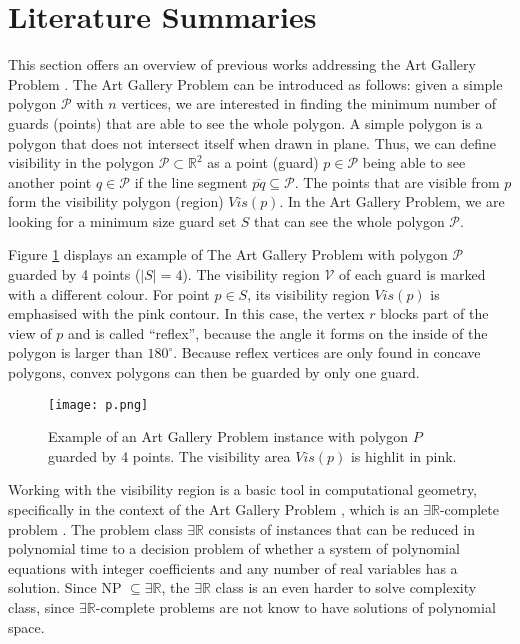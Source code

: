 \section{Literature Summaries}
This section offers an overview of previous works addressing the Art Gallery Problem \cite{o1987art}. The Art Gallery Problem \cite{o1987art} can be introduced as follows: given a simple polygon $\mathcal P$ with $n$ vertices, we are interested in finding the minimum number of guards (points) that are able to see the whole polygon. A simple polygon is a polygon that does not intersect itself when drawn in plane. Thus, we can define visibility in the polygon $\mathcal P \subset \mathbb R^2$ as a point (guard) $p \in \mathcal P$ being able to see another point $q \in \mathcal P$ if the line segment $\overline{pq} \subseteq \mathcal P$. The points that are visible from $p$ form the visibility polygon (region) $Vis(p)$. In the Art Gallery Problem, we are looking for a minimum size guard set $S$ that can see the whole polygon $\mathcal P$.

Figure \ref{fig:art} displays an example of The Art Gallery Problem \cite{o1987art} with polygon $\mathcal P$ guarded by 4 points ($|S| = 4$). The visibility region $\mathcal V$ of each guard is marked with a different colour. For point $p \in S$, its visibility region $Vis(p)$ is emphasised with the pink contour. In this case, the vertex $r$ blocks part of the view of $p$ and is called ``reflex'', because the angle it forms on the inside of the polygon is larger than $180^\circ$. Because reflex vertices are only found in concave polygons, convex polygons can then be guarded by only one guard.

\begin{figure}[h!]
    \centering
    \texttt{[image: p.png]}
    \caption{Example of an Art Gallery Problem instance with polygon $P$ guarded by 4 points. The visibility area $Vis(p)$ is highlit in pink.}
    \label{fig:art}
\end{figure}


Working with the visibility region is a basic tool in computational geometry, specifically in the context of the Art Gallery Problem \cite{o1987art}, which is an $\exists \mathbb R$-complete problem \cite{abrahamsen2021art}. The problem class $\exists \mathbb R$ consists of instances that can be reduced in polynomial time to a decision problem of whether a system of polynomial equations with integer coefficients and any number of real variables has a solution. Since NP $\subseteq \exists \mathbb R$, the $\exists \mathbb R$ class is an even harder to solve complexity class, since $\exists \mathbb R$-complete problems are not know to have solutions of polynomial space. 


